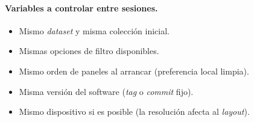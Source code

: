 \paragraph{Variables a controlar entre sesiones.}
\begin{itemize}
\item Mismo \textit{dataset} y misma colección inicial.
\item Mismas opciones de filtro disponibles.
\item Mismo orden de paneles al arrancar (preferencia local limpia).
\item Misma versión del software (\textit{tag} o \textit{commit} fijo).
\item Mismo dispositivo si es posible (la resolución afecta al \textit{layout}).
\end{itemize}
